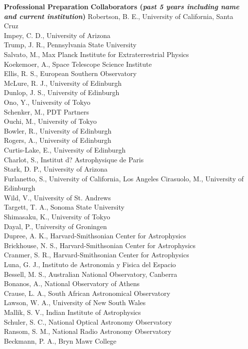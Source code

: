\documentclass[11pt,letterpaper,english]{article}
\begin{document}
\begin{flushleft} {\bf Professional Preparation}
\vspace{-6pt}
{\bf Collaborators ({\emph{past 5 years including name and current institution}})} 
{\parindent 16pt
Robertson, B. E., University of California, Santa Cruz \\
Impey, C. D., University of Arizona \\
Trump, J. R., Pennsylvania State University \\
Salvato, M., Max Planck Institute for Extraterrestrial Physics \\
Koekemoer, A., Space Telescope Science Institute \\
Ellis, R. S., European Southern Observatory \\
McLure, R. J., University of Edinburgh \\
Dunlop, J. S., University of Edinburgh \\
Ono, Y., University of Tokyo \\
Schenker, M., PDT Partners \\
Ouchi, M., University of Tokyo \\
Bowler, R., University of Edinburgh \\
Rogers, A., University of Edinburgh \\
Curtis-Lake, E., University of Edinburgh \\
Charlot, S., Institut d? Astrophysique de Paris \\
Stark, D. P., University of Arizona \\
Furlanetto, S., University of California, Los Angeles Cirasuolo, M., University of Edinburgh \\
Wild, V., University of St. Andrews \\
Targett, T. A., Sonoma State University \\
Shimasaku, K., University of Tokyo \\
Dayal, P., University of Groningen \\
Dupree, A. K., Harvard-Smithsonian Center for Astrophysics \\
Brickhouse, N. S., Harvard-Smithsonian Center for Astrophysics \\
Cranmer, S. R., Harvard-Smithsonian Center for Astrophysics \\
Luna, G. J., Instituto de Astronomia y Fisica del Espacio \\
Bessell, M. S., Australian National Observatory, Canberra \\
Bonanos, A., National Observatory of Athens \\
Crause, L. A., South African Astronomical Observatory \\
Lawson, W. A., University of New South Wales \\
Mallik, S. V., Indian Institute of Astrophysics \\
Schuler, S. C., National Optical Astronomy Observatory \\
Ransom, S. M., National Radio Astronomy Observatory \\
Beckmann, P. A., Bryn Mawr College \\
}


\end{flushleft}
\end{document}
